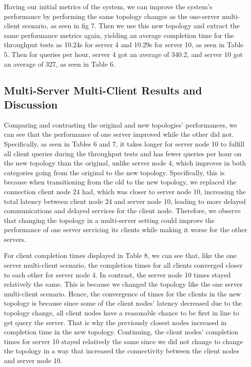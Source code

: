 	Having our initial metrics of the system, we can improve the system's performance by performing the same topology changes as the one-server multi-client scenario, as seen in fig 7. Then we use this new topology and extract the same performance metrics again, yielding an average completion time for the throughput tests as 10.24s for server 4 and 10.29s for server 10, as seen in Table 5. Then for queries per hour, server 4 got an average of 340.2, and server 10 got an average of 327, as seen in Table 6.


\subsection{Multi-Server Multi-Client Results and Discussion}

Comparing and contrasting the original and new topologies' performances, we can see that the performance of one server improved while the other did not. Specifically, as seen in Tables 6 and 7, it takes longer for server node 10 to fulfill all client queries during the throughput tests and has fewer queries per hour on the new topology than the original, unlike server node 4, which improves in both categories going from the original to the new topology. Specifically, this is because when transitioning from the old to the new topology, we replaced the connection client node 24 had, which was closer to server node 10, increasing the total latency between client node 24 and server node 10, leading to more delayed communications and delayed services for the client node. Therefore, we observe that changing the topology in a multi-server setting could improve the performance of one server servicing its clients while making it worse for the other servers. 

For client completion times displayed in Table 8, we can see that, like the one server multi-client scenario, the completion times for all clients converged closer to each other for server node 4. In contrast, the server node 10 times stayed relatively the same.  This is because we changed the topology like the one server multi-client scenario. Hence, the convergence of times for the clients in the new topology is because since some of the client nodes' latency decreased due to the topology change, all client nodes have a reasonable chance to be first in line to get query the server. That is why the previously closest nodes increased in completion time in the new topology. Continuing, the client nodes' completion times for server 10 stayed relatively the same since we did not change to change the topology in a way that increased the connectivity between the client nodes and server node 10.

